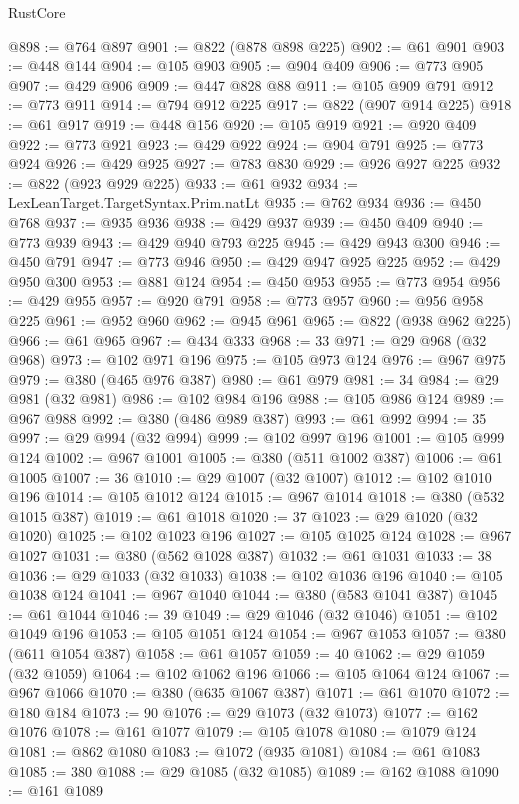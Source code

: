 \begin{lexlean}{RustCore}
\begin{coremodule}
@898 := @764 @897
@901 := @822 (@878 @898 @225)
@902 := @61 @901
@903 := @448 @144
@904 := @105 @903
@905 := @904 @409
@906 := @773 @905
@907 := @429 @906
@909 := @447 @828 @88
@911 := @105 @909 @791
@912 := @773 @911
@914 := @794 @912 @225
@917 := @822 (@907 @914 @225)
@918 := @61 @917
@919 := @448 @156
@920 := @105 @919
@921 := @920 @409
@922 := @773 @921
@923 := @429 @922
@924 := @904 @791
@925 := @773 @924
@926 := @429 @925
@927 := @783 @830
@929 := @926 @927 @225
@932 := @822 (@923 @929 @225)
@933 := @61 @932
@934 := LexLeanTarget.TargetSyntax.Prim.natLt
@935 := @762 @934
@936 := @450 @768
@937 := @935 @936
@938 := @429 @937
@939 := @450 @409
@940 := @773 @939
@943 := @429 @940 @793 @225
@945 := @429 @943 @300
@946 := @450 @791
@947 := @773 @946
@950 := @429 @947 @925 @225
@952 := @429 @950 @300
@953 := @881 @124
@954 := @450 @953
@955 := @773 @954
@956 := @429 @955
@957 := @920 @791
@958 := @773 @957
@960 := @956 @958 @225
@961 := @952 @960
@962 := @945 @961
@965 := @822 (@938 @962 @225)
@966 := @61 @965
@967 := @434 @333
@968 := 33
@971 := @29 @968 (@32 @968)
@973 := @102 @971 @196
@975 := @105 @973 @124
@976 := @967 @975
@979 := @380 (@465 @976 @387)
@980 := @61 @979
@981 := 34
@984 := @29 @981 (@32 @981)
@986 := @102 @984 @196
@988 := @105 @986 @124
@989 := @967 @988
@992 := @380 (@486 @989 @387)
@993 := @61 @992
@994 := 35
@997 := @29 @994 (@32 @994)
@999 := @102 @997 @196
@1001 := @105 @999 @124
@1002 := @967 @1001
@1005 := @380 (@511 @1002 @387)
@1006 := @61 @1005
@1007 := 36
@1010 := @29 @1007 (@32 @1007)
@1012 := @102 @1010 @196
@1014 := @105 @1012 @124
@1015 := @967 @1014
@1018 := @380 (@532 @1015 @387)
@1019 := @61 @1018
@1020 := 37
@1023 := @29 @1020 (@32 @1020)
@1025 := @102 @1023 @196
@1027 := @105 @1025 @124
@1028 := @967 @1027
@1031 := @380 (@562 @1028 @387)
@1032 := @61 @1031
@1033 := 38
@1036 := @29 @1033 (@32 @1033)
@1038 := @102 @1036 @196
@1040 := @105 @1038 @124
@1041 := @967 @1040
@1044 := @380 (@583 @1041 @387)
@1045 := @61 @1044
@1046 := 39
@1049 := @29 @1046 (@32 @1046)
@1051 := @102 @1049 @196
@1053 := @105 @1051 @124
@1054 := @967 @1053
@1057 := @380 (@611 @1054 @387)
@1058 := @61 @1057
@1059 := 40
@1062 := @29 @1059 (@32 @1059)
@1064 := @102 @1062 @196
@1066 := @105 @1064 @124
@1067 := @967 @1066
@1070 := @380 (@635 @1067 @387)
@1071 := @61 @1070
@1072 := @180 @184
@1073 := 90
@1076 := @29 @1073 (@32 @1073)
@1077 := @162 @1076
@1078 := @161 @1077
@1079 := @105 @1078
@1080 := @1079 @124
@1081 := @862 @1080
@1083 := @1072 (@935 @1081)
@1084 := @61 @1083
@1085 := 380
@1088 := @29 @1085 (@32 @1085)
@1089 := @162 @1088
@1090 := @161 @1089

\end{coremodule}
\end{lexlean}
